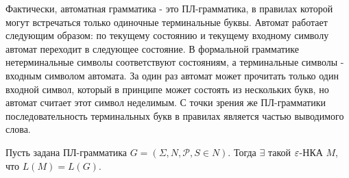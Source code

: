 Фактически, автоматная грамматика - это ПЛ-грамматика, в правилах которой могут встречаться только одиночные терминальные буквы.
Автомат работает следующим образом: по текущему состоянию и текущему входному символу автомат переходит в следующее состояние. В формальной грамматике нетерминальные символы соответствуют состояниям, а терминальные символы - входным символом автомата. За один раз автомат может прочитать только один входной символ, который в принципе может состоять из нескольких букв, но автомат считает этот символ неделимым. С точки зрения же ПЛ-грамматики последовательность терминальных букв в правилах является частью выводимого слова.
\begin{mylemma}
\label{lemma-pl-to-nka}
Пусть задана ПЛ-грамматика $G = (\Sigma, N, \mathcal P, S \in N)$. Тогда $\exists$ такой $\varepsilon$-НКА $M$, что $L(M) = L(G)$.
\end{mylemma}
